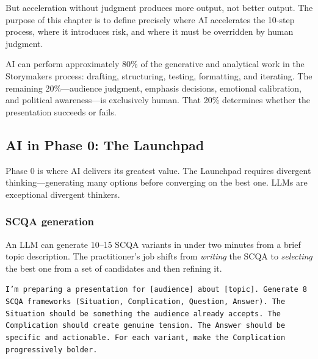 But acceleration without judgment produces more output, not better output. The purpose of this chapter is to define precisely where AI accelerates the 10-step process, where it introduces risk, and where it must be overridden by human judgment.


\begin{thesisbox}
AI can perform approximately 80\% of the generative and analytical work in the Storymakers process: drafting, structuring, testing, formatting, and iterating. The remaining 20\%---audience judgment, emphasis decisions, emotional calibration, and political awareness---is exclusively human. That 20\% determines whether the presentation succeeds or fails.
\end{thesisbox}

\subsection{AI in Phase 0: The Launchpad}

Phase 0 is where AI delivers its greatest value. The Launchpad requires divergent thinking---generating many options before converging on the best one. LLMs are exceptional divergent thinkers.

\subsubsection{SCQA generation}

An LLM can generate 10--15 SCQA variants in under two minutes from a brief topic description. The practitioner's job shifts from \emph{writing} the SCQA to \emph{selecting} the best one from a set of candidates and then refining it.

\begin{keybox}
\texttt{I'm preparing a presentation for [audience] about [topic]. Generate 8 SCQA frameworks (Situation, Complication, Question, Answer). The Situation should be something the audience already accepts. The Complication should create genuine tension. The Answer should be specific and actionable. For each variant, make the Complication progressively bolder.}
\end{keybox}

